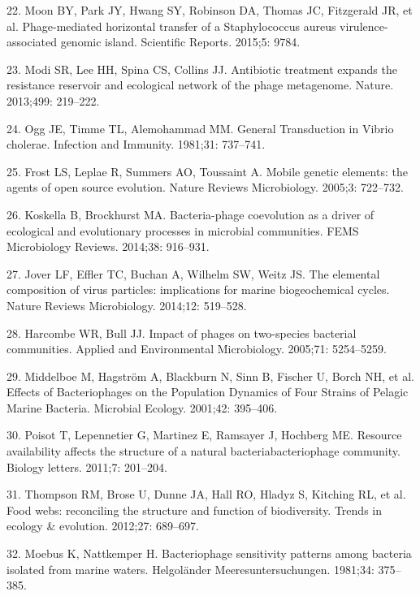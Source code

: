 \documentclass[12pt,]{article}
\begin{document}
\hypertarget{ref-Moon:2015fa}{}
22. Moon BY, Park JY, Hwang SY, Robinson DA, Thomas JC, Fitzgerald JR,
et al. Phage-mediated horizontal transfer of a Staphylococcus aureus
virulence-associated genomic island. Scientific Reports. 2015;5: 9784.

\hypertarget{ref-Modi:2013fi}{}
23. Modi SR, Lee HH, Spina CS, Collins JJ. Antibiotic treatment expands
the resistance reservoir and ecological network of the phage metagenome.
Nature. 2013;499: 219--222.

\hypertarget{ref-Ogg:1981th}{}
24. Ogg JE, Timme TL, Alemohammad MM. General Transduction in Vibrio
cholerae. Infection and Immunity. 1981;31: 737--741.

\hypertarget{ref-Frost:2005dn}{}
25. Frost LS, Leplae R, Summers AO, Toussaint A. Mobile genetic
elements: the agents of open source evolution. Nature Reviews
Microbiology. 2005;3: 722--732.

\hypertarget{ref-Koskella:2014ds}{}
26. Koskella B, Brockhurst MA. Bacteria-phage coevolution as a driver of
ecological and evolutionary processes in microbial communities. FEMS
Microbiology Reviews. 2014;38: 916--931.

\hypertarget{ref-Jover:2014gq}{}
27. Jover LF, Effler TC, Buchan A, Wilhelm SW, Weitz JS. The elemental
composition of virus particles: implications for marine biogeochemical
cycles. Nature Reviews Microbiology. 2014;12: 519--528.

\hypertarget{ref-Harcombe:2005fd}{}
28. Harcombe WR, Bull JJ. Impact of phages on two-species bacterial
communities. Applied and Environmental Microbiology. 2005;71:
5254--5259.

\hypertarget{ref-Middelboe:2001fl}{}
29. Middelboe M, Hagström A, Blackburn N, Sinn B, Fischer U, Borch NH,
et al. Effects of Bacteriophages on the Population Dynamics of Four
Strains of Pelagic Marine Bacteria. Microbial Ecology. 2001;42:
395--406.

\hypertarget{ref-Poisot:2011jc}{}
30. Poisot T, Lepennetier G, Martinez E, Ramsayer J, Hochberg ME.
Resource availability affects the structure of a natural
bacteriabacteriophage community. Biology letters. 2011;7: 201--204.

\hypertarget{ref-Thompson:2012ki}{}
31. Thompson RM, Brose U, Dunne JA, Hall RO, Hladyz S, Kitching RL, et
al. Food webs: reconciling the structure and function of biodiversity.
Trends in ecology \& evolution. 2012;27: 689--697.

\hypertarget{ref-Moebus:1981kp}{}
32. Moebus K, Nattkemper H. Bacteriophage sensitivity patterns among
bacteria isolated from marine waters. Helgoländer Meeresuntersuchungen.
1981;34: 375--385.
\end{document}

